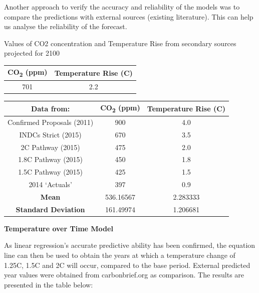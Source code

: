 \documentclass[12pt]{mcmthesis}
\begin{document}
    Another approach to verify the accuracy and reliability of the models was to compare the predictions with external sources (existing literature). This can help us analyse the reliability of the forecast.

    Values of CO2 concentration and Temperature Rise from secondary sources projected for 2100

    \begin{center}
        \begin{tabular}{ |c|c|}
            \hline
            \textbf{CO\textsubscript{2} (ppm)} & \textbf{Temperature Rise (C)} \\
            \hline
            701 & 2.2 \\
            \hline
        \end{tabular}
    \end{center}

    \begin{center}
        \begin{tabular}{ |c|c|c|}
            \hline
            Data from: & \textbf{CO\textsubscript{2} (ppm)} & \textbf{Temperature Rise (C)} \\
            \hline
            Confirmed Proposals (2011) & 900 & 4.0 \\
            \hline
            INDCs Strict (2015) & 670 & 3.5 \\ \hline
            2C Pathway (2015) & 475 & 2.0 \\ \hline
            1.8C Pathway (2015) & 450 & 1.8 \\ \hline
            1.5C Pathway (2015) & 425 & 1.5 \\ \hline
            2014 `Actuals' & 397 & 0.9 \\ \hline
            \textbf{Mean} & 536.16567 & 2.283333 \\ \hline
            \textbf{Standard Deviation} & 161.49974 & 1.206681 \\ \hline
        \end{tabular}
    \end{center}


    \noindent\textbf{Temperature over Time Model}

    As linear regression’s accurate predictive ability has been confirmed, the equation line can then be used to obtain the years at which a temperature change of 1.25C, 1.5C and 2C will occur, compared to the base period. External predicted year values were obtained from carbonbrief.org as comparison. The results are presented in the table below:
\end{document}

